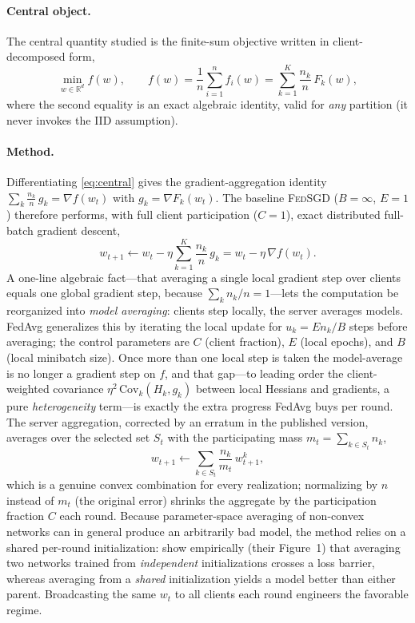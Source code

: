 \documentclass[11pt]{article}
\begin{document}
\paragraph{Central object.}
The central quantity studied is the finite-sum objective written in client-decomposed form,
\begin{equation}
\min_{w\in\mathbb{R}^d} f(w),
\qquad
f(w) = \frac{1}{n}\sum_{i=1}^{n} f_i(w) = \sum_{k=1}^{K} \frac{n_k}{n}\, F_k(w),
\label{eq:central}
\end{equation}
where the second equality is an exact algebraic identity, valid for \emph{any} partition (it never invokes the IID assumption).

\paragraph{Method.}
Differentiating \eqref{eq:central} gives the gradient-aggregation identity $\sum_k \frac{n_k}{n}\, g_k = \nabla f(w_t)$ with $g_k=\nabla F_k(w_t)$. The baseline \textsc{FedSGD} ($B=\infty$, $E=1$) therefore performs, with full client participation ($C=1$), exact distributed full-batch gradient descent,
\begin{equation}
w_{t+1} \leftarrow w_t - \eta \sum_{k=1}^{K} \frac{n_k}{n}\, g_k = w_t - \eta\,\nabla f(w_t).
\label{eq:fedsgd}
\end{equation}
A one-line algebraic fact---that averaging a single local gradient step over clients equals one global gradient step, because $\sum_k n_k/n = 1$---lets the computation be reorganized into \emph{model averaging}: clients step locally, the server averages models. FedAvg generalizes this by iterating the local update for $u_k = E n_k / B$ steps before averaging; the control parameters are $C$ (client fraction), $E$ (local epochs), and $B$ (local minibatch size). Once more than one local step is taken the model-average is no longer a gradient step on $f$, and that gap---to leading order the client-weighted covariance $\eta^2\,\mathrm{Cov}_k(H_k, g_k)$ between local Hessians and gradients, a pure \emph{heterogeneity} term---is exactly the extra progress FedAvg buys per round. The server aggregation, corrected by an erratum in the published version, averages over the selected set $S_t$ with the participating mass $m_t=\sum_{k\in S_t} n_k$,
\begin{equation}
w_{t+1} \leftarrow \sum_{k\in S_t} \frac{n_k}{m_t}\, w^{k}_{t+1},
\label{eq:agg}
\end{equation}
which is a genuine convex combination for every realization; normalizing by $n$ instead of $m_t$ (the original error) shrinks the aggregate by the participation fraction $C$ each round. Because parameter-space averaging of non-convex networks can in general produce an arbitrarily bad model, the method relies on a shared per-round initialization: \citet{mcmahan2017fedavg} show empirically (their Figure~1) that averaging two networks trained from \emph{independent} initializations crosses a loss barrier, whereas averaging from a \emph{shared} initialization yields a model better than either parent. Broadcasting the same $w_t$ to all clients each round engineers the favorable regime.
\end{document}
